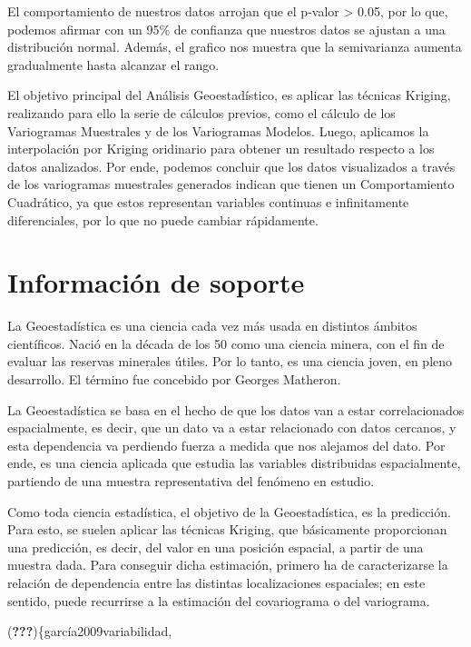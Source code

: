 \documentclass[11pt,]{article}
\begin{document}
El comportamiento de nuestros datos arrojan que el p-valor
\textgreater{} 0.05, por lo que, podemos afirmar con un 95\% de
confianza que nuestros datos se ajustan a una distribución normal.
Además, el grafico nos muestra que la semivarianza aumenta gradualmente
hasta alcanzar el rango.

El objetivo principal del Análisis Geoestadístico, es aplicar las
técnicas Kriging, realizando para ello la serie de cálculos previos,
como el cálculo de los Variogramas Muestrales y de los Variogramas
Modelos. Luego, aplicamos la interpolación por Kriging oridinario para
obtener un resultado respecto a los datos analizados. Por ende, podemos
concluir que los datos visualizados a través de los variogramas
muestrales generados indican que tienen un Comportamiento Cuadrático, ya
que estos representan variables continuas e infinitamente diferenciales,
por lo que no puede cambiar rápidamente.

\section{Información de soporte}\label{informaciuxf3n-de-soporte}

La Geoestadística es una ciencia cada vez más usada en distintos ámbitos
científicos. Nació en la década de los 50 como una ciencia minera, con
el fin de evaluar las reservas minerales útiles. Por lo tanto, es una
ciencia joven, en pleno desarrollo. El término fue concebido por Georges
Matheron.

La Geoestadística se basa en el hecho de que los datos van a estar
correlacionados espacialmente, es decir, que un dato va a estar
relacionado con datos cercanos, y esta dependencia va perdiendo fuerza a
medida que nos alejamos del dato. Por ende, es una ciencia aplicada que
estudia las variables distribuidas espacialmente, partiendo de una
muestra representativa del fenómeno en estudio.

Como toda ciencia estadística, el objetivo de la Geoestadística, es la
predicción. Para esto, se suelen aplicar las técnicas Kriging, que
básicamente proporcionan una predicción, es decir, del valor en una
posición espacial, a partir de una muestra dada. Para conseguir dicha
estimación, primero ha de caracterizarse la relación de dependencia
entre las distintas localizaciones espaciales; en este sentido, puede
recurrirse a la estimación del covariograma o del variograma.

({\textbf{???}})\{garcía2009variabilidad,
\end{document}
